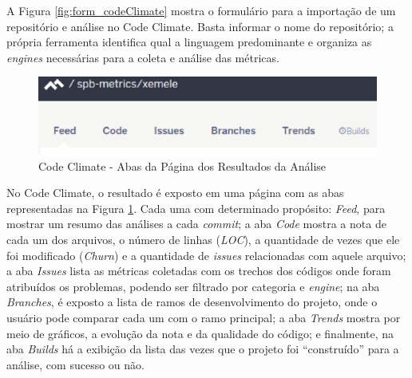 A Figura \ref{fig:form_codeClimate} mostra o formulário para a importação de um
repositório e análise no Code Climate. Basta informar o nome do repositório; a
própria ferramenta identifica qual a linguagem predominante e organiza as
\textit{engines} necessárias para a coleta e análise das métricas.

\begin{figure}[!htb]
	\centering
    \includegraphics[keepaspectratio=true,scale=0.5]
    {figuras/codeclimate_abas.eps}
  \caption{Code Climate - Abas da Página dos Resultados da Análise}
	\label{fig:codeclimate_abas}
\end{figure}

No Code Climate, o resultado é exposto em uma página com as abas representadas
na Figura \ref{fig:codeclimate_abas}. Cada uma com determinado propósito:
\textit{Feed}, para mostrar um resumo das análises a cada \textit{commit}; a aba
\textit{Code} mostra a nota de cada um dos arquivos, o número de linhas (\textit{LOC}),
a quantidade de vezes que ele foi modificado (\textit{Churn}) e a quantidade de
\textit{issues} relacionadas com aquele arquivo; a aba \textit{Issues} lista as
métricas coletadas com os trechos dos códigos onde foram atribuídos os problemas,
podendo ser filtrado por categoria e \textit{engine}; na aba \textit{Branches},
é exposto a lista de ramos de desenvolvimento do projeto, onde o usuário pode
comparar cada um com o ramo principal; a aba \textit{Trends} mostra por meio de
gráficos, a evolução da nota e da qualidade do código; e finalmente, na aba
\textit{Builds} há a exibição da lista das vezes que o projeto foi ``construído''
para a análise, com sucesso ou não.

